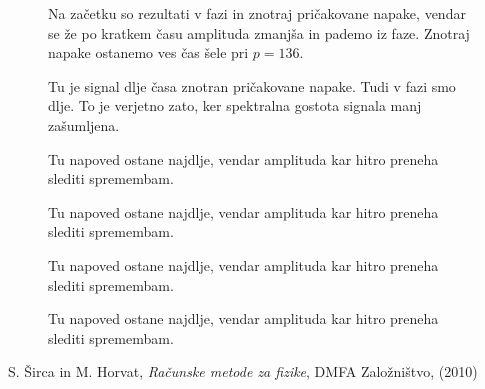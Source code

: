 \documentclass[a4 paper, 12pt]{article}
\begin{document}
\begin{figure}[H]\centering
	
	\caption{Na za\v cetku so rezultati v fazi in znotraj pri\v cakovane napake, vendar se \v ze po kratkem
		\v casu amplituda zmanj\v sa in pademo iz faze. Znotraj napake ostanemo ves \v cas \v sele pri
		$p = 136$.}
	\label{pred1}
\end{figure}

\begin{figure}[H]\centering
	
	\caption{Tu je signal dlje \v casa znotran pri\v cakovane napake. Tudi v fazi smo dlje. To je verjetno zato,
		ker spektralna gostota signala manj za\v sumljena.}
	\label{pred2}
\end{figure}

\begin{figure}[H]\centering
	
	\caption{Tu napoved ostane najdlje, vendar amplituda kar hitro preneha slediti spremembam.}
	\label{pred3}
\end{figure}

\begin{figure}[H]\centering
	
	\caption{Tu napoved ostane najdlje, vendar amplituda kar hitro preneha slediti spremembam.}
	\label{pred4}
\end{figure}

\begin{figure}[H]\centering
	
	\caption{Tu napoved ostane najdlje, vendar amplituda kar hitro preneha slediti spremembam.}
	\label{pred5}
\end{figure}

\begin{figure}[H]\centering
	
	\caption{Tu napoved ostane najdlje, vendar amplituda kar hitro preneha slediti spremembam.}
	\label{pred6}
\end{figure}



\begin{thebibliography}{9}
		S. \v Sirca in M. Horvat,
		{\em Ra\v cunske metode za fizike},
		DMFA Zalo\v zni\v stvo,
		(2010)
\end{thebibliography}
\end{document}
